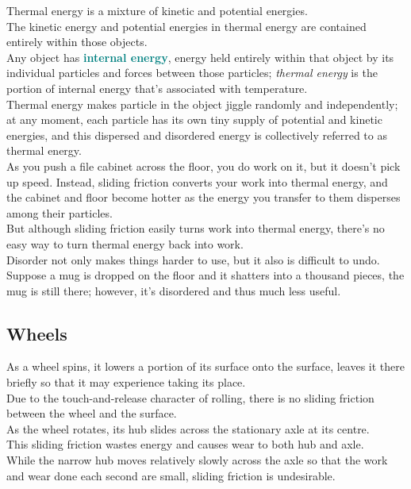 \documentclass[12pt]{article}
\theoremstyle{definition}
\newcommand{\defnterm}[1]{\textbf{\textcolor{teal}{#1}}\index{#1}}
\begin{document}
Thermal energy is a mixture of kinetic and potential energies. \\
The kinetic energy and potential energies in thermal energy are contained entirely within those objects. \\
Any object has \defnterm{internal energy}, energy held entirely within that object by its individual particles and forces between those particles;
\emph{thermal energy} is the portion of internal energy that's associated with temperature. \\
Thermal energy makes particle in the object jiggle randomly and independently;
at any moment, each particle has its own tiny supply of potential and kinetic energies, and this dispersed and disordered energy is collectively referred to as thermal energy. \\

As you push a file cabinet across the floor, you do work on it, but it doesn't pick up speed.
Instead, sliding friction converts your work into thermal energy, and the cabinet and floor become hotter as the energy you transfer to them disperses among their particles. \\
But although sliding friction easily turns work into thermal energy, there's no easy way to turn thermal energy back into work. \\
Disorder not only makes things harder to use, but it also is difficult to undo.
Suppose a mug is dropped on the floor and it shatters into a thousand pieces, the mug is still there;
however, it's disordered and thus much less useful.

\subsection{Wheels}
As a wheel spins, it lowers a portion of its surface onto the surface, leaves it there briefly so that it may experience taking its place. \\
Due to the touch-and-release character of rolling, there is no sliding friction between the wheel and the surface. \\

As the wheel rotates, its hub slides across the stationary axle at its centre. \\
This sliding friction wastes energy and causes wear to both hub and axle. \\
While the narrow hub moves relatively slowly across the axle so that the work and wear done each second are small, sliding friction is undesirable. \\
\end{document}
